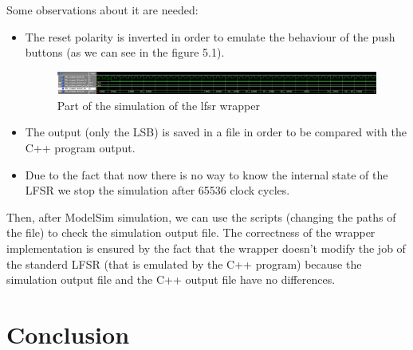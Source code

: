 \documentclass[a4paper]{report}
\begin{document}
\noindent Some observations about it are needed:
\begin{itemize}
	\item The reset polarity is inverted in order to emulate the behaviour of the push buttons (as we can see in the figure 5.1).
	\begin{figure}[htpb]
	\centering
	\includegraphics[width=.64\textheight, height=.09\textheight]{img/tb/wave_lfsr_wrapper_test.png}
	\caption{Part of the simulation of the lfsr wrapper}
\end{figure}
	\item The output (only the LSB) is saved in a file in order to be compared with the C++ program output.
	\item Due to the fact that now there is no way to know the internal state of the LFSR we stop the simulation after 65536 clock cycles.
\end{itemize}
Then, after ModelSim simulation, we can use the scripts (changing the paths of the file) to check the simulation output file. The correctness of the wrapper implementation is ensured by the fact that the wrapper doesn't modify the job of the standerd LFSR (that is emulated by the C++ program) because the simulation output file and the C++ output file have no differences.

\chapter{Conclusion}
\end{document}
